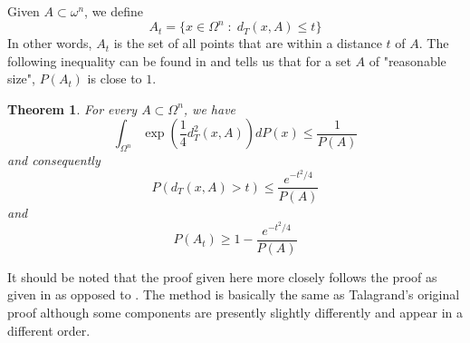 \documentclass[12pt]{report}
\newtheorem{thm}{Theorem}[section]
\newcommand{\be}{\begin{equation}}
\newcommand{\ee}{\end{equation}}
\theoremstyle{definition}
\begin{document}
Given $A\subset\omega^n$, we define 
$$
A_t=\{x\in\Omega^n \; : \;d_T(x,A)\leq t\}
$$
In other words, $A_t$ is the set of all points that are within a distance $t$ of $A$.  The following inequality can be found in \cite{Talagrand} and tells us that for a set $A$ of "reasonable size", $P(A_t)$ is close to $1$.  
\begin{thm}
\label{tal}
For every $A\subset\Omega^n$, we have 
\be
\int_{\Omega^n}\exp\left(\frac{1}{4}d_T^2(x,A)\right)dP(x)\leq \frac{1}{P(A)}
\ee
and consequently
\be
P(d_T(x,A)>t)\leq \frac{e^{-t^2/4}}{P(A)}
\ee
and 
\be
P(A_t)\geq 1-\frac{e^{-t^2/4}}{P(A)}
\ee
\end{thm}
It should be noted that the proof given here more closely follows the proof as given in \cite{Steele} as opposed to \cite{Talagrand}.  The method is basically the same as Talagrand's original proof although some components are presently slightly differently and appear in a different order. 
\end{document}
